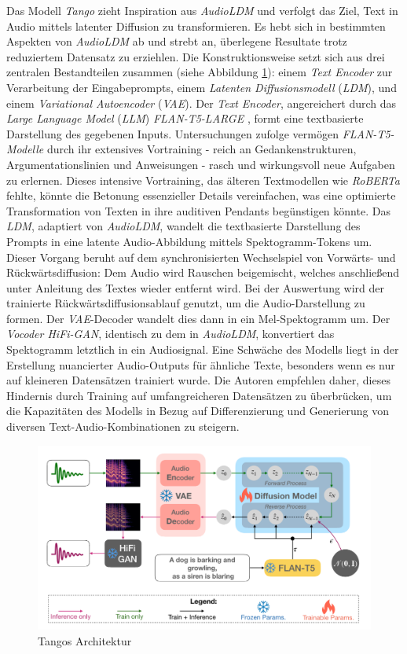 \documentclass[
  a4paper,  %
  twoside,  %
  bibliography=totoc,
  headsepline,
  cleardoublepage=empty,
  parskip=half,
  draft=false
]{scrbook}
\begin{document}
Das Modell \emph{Tango} \cite{ghosal_text--audio_2023} zieht Inspiration aus \emph{AudioLDM} und verfolgt das Ziel, Text in Audio mittels latenter Diffusion zu transformieren. Es hebt sich in bestimmten Aspekten von \emph{AudioLDM} ab und strebt an, überlegene Resultate trotz reduziertem Datensatz zu erziehlen. Die Konstruktionsweise setzt sich aus drei zentralen Bestandteilen zusammen (siehe Abbildung \ref{fig:tango}): einem \emph{Text Encoder} zur Verarbeitung der Eingabeprompts, einem \emph{Latenten Diffusionsmodell} (\emph{LDM})\cite{rombach_high-resolution_2022}, und einem \emph{Variational Autoencoder} (\emph{VAE})\cite{kingma_auto-encoding_2022}. Der \emph{Text Encoder}, angereichert durch das \emph{Large Language Model} (\emph{LLM}) \emph{FLAN-T5-LARGE} \cite{chung_scaling_2022}, formt eine textbasierte Darstellung des gegebenen Inputs. Untersuchungen \cite{dai_why_2023} zufolge vermögen \emph{FLAN-T5-Modelle} durch ihr extensives Vortraining - reich an Gedankenstrukturen, Argumentationslinien und Anweisungen - rasch und wirkungsvoll neue Aufgaben zu erlernen. Dieses intensive Vortraining, das älteren Textmodellen wie \emph{RoBERTa}\cite{liu_roberta_2019} fehlte, könnte die Betonung essenzieller Details vereinfachen, was eine optimierte Transformation von Texten in ihre auditiven Pendants begünstigen könnte. Das \emph{LDM}, adaptiert von \emph{AudioLDM}, wandelt die textbasierte Darstellung des Prompts in eine latente Audio-Abbildung mittels Spektogramm-Tokens um. Dieser Vorgang beruht auf dem synchronisierten Wechselspiel von Vorwärts- und Rückwärtsdiffusion: Dem Audio wird Rauschen beigemischt, welches anschließend unter Anleitung des Textes wieder entfernt wird. Bei der Auswertung wird der trainierte Rückwärtsdiffusionsablauf genutzt, um die Audio-Darstellung zu formen. Der \emph{VAE}-Decoder wandelt dies dann in ein Mel-Spektogramm um. Der \emph{Vocoder HiFi-GAN}\cite{kong_hifi-gan_2020}, identisch zu dem in \emph{AudioLDM}, konvertiert das Spektogramm letztlich in ein Audiosignal. Eine Schwäche des Modells liegt in der Erstellung nuancierter Audio-Outputs für ähnliche Texte, besonders wenn es nur auf kleineren Datensätzen trainiert wurde. Die Autoren empfehlen daher, dieses Hindernis durch Training auf umfangreicheren Datensätzen zu überbrücken, um die Kapazitäten des Modells in Bezug auf Differenzierung und Generierung von diversen Text-Audio-Kombinationen zu steigern. \cite{ghosal_text--audio_2023}

\begin{figure}[h]
  \centering
  \includegraphics[width=.7\textwidth]{graphics/Tango.png}
  \caption[Tango Architektur]{Tangos Architektur \cite{liu_roberta_2019}}
  \label{fig:tango}
\end{figure}
\end{document}
